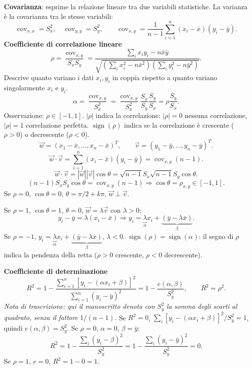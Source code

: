 \documentclass[11pt,a4paper]{article}
\newcommand{\pagina}[1]{\clearpage}
\begin{document}
\textbf{Covarianza}: esprime la relazione lineare tra due variabili statistiche. La varianza è la covarianza tra le stesse variabili:
\[\operatorname{cov}_{x,x}=S_x^2,\quad\operatorname{cov}_{y,y}=S_y^2,\qquad\boxed{\operatorname{cov}_{x,y}=\frac1{n-1}\sum_{i=1}^n(x_i-\bar x)(y_i-\bar y)}.\]
\pagina{10}\textbf{Coefficiente di correlazione lineare}
\[\boxed{\rho=\frac{\operatorname{cov}_{x,y}}{S_xS_y}}=\frac{\sum_i x_i y_i-n\bar x\bar y}{\sqrt{(\sum_i x_i^2-n\bar x^2)(\sum_i y_i^2-n\bar y^2)}}.\]
Descrive quanto variano i dati $x_i,y_i$ in coppia rispetto a quanto variano singolarmente $x_i$ e $y_i$.
\[\alpha=\frac{\operatorname{cov}_{x,y}}{S_x^2}=\frac{\operatorname{cov}_{x,y}}{S_x^2}\frac{S_x}{S_y}\frac{S_y}{S_x}=\boxed{\rho\frac{S_y}{S_x}}.\]
Osservazione: $\rho\in[-1,1]$. $|\rho|$ indica la correlazione: $|\rho|=0$ nessuna correlazione, $|\rho|=1$ correlazione perfetta. $\operatorname{sign}(\rho)$ indica se la correlazione è crescente ($\rho>0$) o decrescente ($\rho<0$).
\[\vec w=(x_1-\bar x,\ldots,x_n-\bar x)^T,\qquad\vec v=(y_1-\bar y,\ldots,y_n-\bar y)^T.\]
\[\vec w\cdot\vec v=\sum_{i=1}^n(x_i-\bar x)(y_i-\bar y)=\operatorname{cov}_{x,y}(n-1).\]
\[\vec w\cdot\vec v=|\vec w||\vec v|\cos\theta=\sqrt{n-1}S_x\sqrt{n-1}S_y\cos\theta.\]
\[(n-1)S_xS_y\cos\theta=\operatorname{cov}_{x,y}(n-1)\Rightarrow\cos\theta=\rho_{x,y}\in[-1,1].\]
Se $\rho=0$, $\cos\theta=0$, $\theta=\pi/2+k\pi$, $\vec w\perp\vec v$.

Se $\rho=1$, $\cos\theta=1$, $\theta=0$, $\vec w=\lambda\vec v$ con $\lambda>0$:
\[y_i-\bar y=\lambda(x_i-\bar x)\Rightarrow y_i=\underbrace{\lambda}_{\alpha}x_i+\underbrace{(\bar y-\lambda\bar x)}_{\beta}.\]
\pagina{11}Se $\rho=-1$, $y_i=\underbrace{\lambda}_{\alpha}x_i+\underbrace{(\bar y-\lambda\bar x)}_{\beta}$, $\lambda<0$.
$\operatorname{sign}(\rho)=\operatorname{sign}(\alpha)$: il segno di $\rho$ indica la pendenza della retta ($\rho>0$ crescente, $\rho<0$ decrescente).

\textbf{Coefficiente di determinazione}
\[R^2=1-\frac{\sum_{i=1}^n[y_i-(\alpha x_i+\beta)]^2}{\sum_{i=1}^n(y_i-\bar y)^2}=\boxed{1-\frac{e(\alpha,\beta)}{S_y^2}},\qquad\boxed{R^2=\rho^2}.\]
\emph{Nota di trascrizione: qui il manoscritto denota con $S_y^2$ la somma degli scarti al quadrato, senza il fattore $1/(n-1)$.}
Se $R^2=0$, $\sum_i[y_i-(\alpha x_i+\beta)]^2/S_y^2=1$, quindi $e(\alpha,\beta)=S_y^2$.
Se $\rho=0$, $\alpha=0$, $\beta=\bar y$:
\[R^2=1-\frac{\sum_i(y_i-\beta)^2}{S_y^2}=1-\frac{\sum_i(y_i-\bar y)^2}{S_y^2}=0.\]
Se $\rho=1$, $e=0$, $R^2=1-0=1$.
\end{document}
